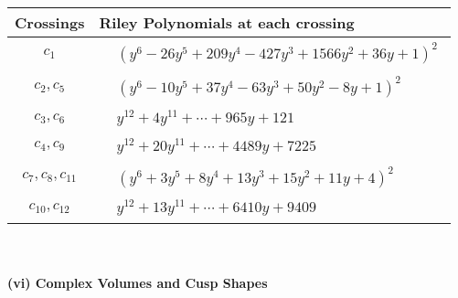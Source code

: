 \documentclass[1p]{elsarticle_modified}
\theoremstyle{definition}
\begin{document}
\begin{tabular}{m{50pt}|m{274pt}}
Crossings & \hspace{64pt}Riley Polynomials at each crossing \\
\hline $$\begin{aligned}c_{1}\end{aligned}$$&$\begin{aligned}
&(y^6-26 y^5+209 y^4-427 y^3+1566 y^2+36 y+1)^2
\end{aligned}$\\
\hline $$\begin{aligned}c_{2},c_{5}\end{aligned}$$&$\begin{aligned}
&(y^6-10 y^5+37 y^4-63 y^3+50 y^2-8 y+1)^2
\end{aligned}$\\
\hline $$\begin{aligned}c_{3},c_{6}\end{aligned}$$&$\begin{aligned}
&y^{12}+4 y^{11}+\cdots+965 y+121
\end{aligned}$\\
\hline $$\begin{aligned}c_{4},c_{9}\end{aligned}$$&$\begin{aligned}
&y^{12}+20 y^{11}+\cdots+4489 y+7225
\end{aligned}$\\
\hline $$\begin{aligned}c_{7},c_{8},c_{11}\end{aligned}$$&$\begin{aligned}
&(y^6+3 y^5+8 y^4+13 y^3+15 y^2+11 y+4)^2
\end{aligned}$\\
\hline $$\begin{aligned}c_{10},c_{12}\end{aligned}$$&$\begin{aligned}
&y^{12}+13 y^{11}+\cdots+6410 y+9409
\end{aligned}$\\
\hline
\end{tabular}\\~\\
\newpage\flushleft \textbf{(vi) Complex Volumes and Cusp Shapes}
\end{document}

